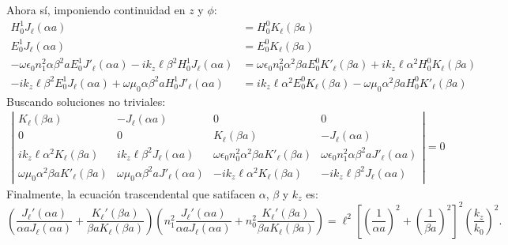 Ahora sí, imponiendo continuidad en $z$ y $\phi$:
\begin{align}
	H_0^{1} J_\ell(\alpha a) &= H_0^{0} K_\ell (\beta a)
	\label{eqn:cont1}
	\\
	E_0^{1} J_\ell(\alpha a) &= E_0^{0} K_\ell (\beta a)
	\label{eqn:cont2}
	 \\
	 -\omega \epsilon_0 n_1^2  \alpha\beta^2 a E_0^1 J'_\ell (\alpha a)-ik_z\ell \beta^2 H_0^1  J_\ell (\alpha a)
	 &= \omega \epsilon_0 n_0^2 \alpha^2 \beta a E_0^0 K'_\ell (\beta a)+ik_z\ell \alpha^2H_0^0  K_\ell (\beta a)
	 \label{eqn:cont3}
	 \\
	 -ik_z \ell \beta^2 E_0^1   J_\ell (\alpha a) + \omega \mu_0  \alpha \beta^2 a H_0^1  J'_\ell (\alpha a) &=
	 ik_z \ell \alpha^2 E_0^0   K_\ell (\beta a) -\omega \mu_0  \alpha^2 \beta a H_0^0  K'_\ell (\beta a)
	 \label{eqn:cont4}
\end{align}
Buscando soluciones no triviales:
\begin{align*}
	\left|\begin{matrix}
		K_\ell(\beta a) & -J_\ell(\alpha a) & 0 & 0
		\\
		0 & 0 & K_\ell(\beta a) & -J_\ell(\alpha a)
		\\
		ik_z\ell \alpha^2 K_\ell (\beta a) & ik_z\ell\beta^2 J_\ell (\alpha a) & \omega \epsilon_0 n_0^2  \alpha^2 \beta a K'_\ell (\beta a) & \omega \epsilon_0 n_1^2  \alpha \beta^2 a J'_\ell (\alpha a)
		\\
		\omega \mu_0  \alpha^2 \beta a   K'_\ell (\beta a) &  \omega \mu_0  \alpha \beta^2 a J'_\ell (\alpha a) & -ik_z \ell \alpha^2 K_\ell (\beta a) &  -ik_z \ell \beta^2  J_\ell (\alpha a)
	\end{matrix}\right|
	=
0
\end{align*}
Finalmente, la ecuación trascendental que satifacen $\alpha$, $\beta$ y $k_z$ es:
\begin{equation}
	\left( \frac{J_\ell'(\alpha a)}{\alpha a J_\ell(\alpha a)} + \frac{K_\ell'(\beta a)}{\beta a K_\ell(\beta a)} \right)\left( n_1^2\frac{J_\ell'(\alpha a)}{\alpha a J_\ell(\alpha a)} + n_0^2\frac{K_\ell'(\beta a)}{\beta a K_\ell(\beta a)} \right) = \ell^2 \left[ \left(\frac{1}{\alpha a}\right)^2 + \left(\frac{1}{\beta a}\right)^2 \right]^2 \left( \frac{k_z}{k_0} \right)^2 . \label{eqn:fiber_trascendental}
\end{equation}


